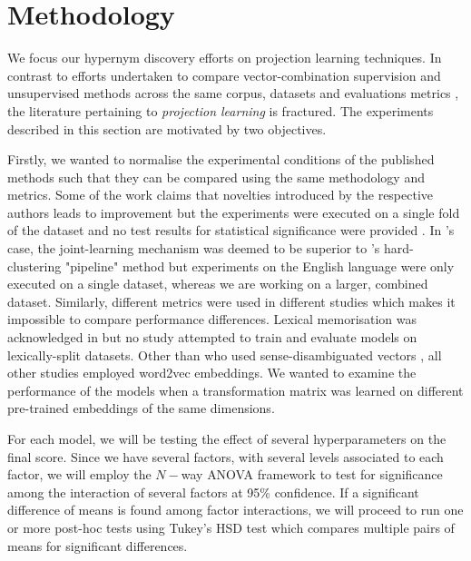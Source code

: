 \chapter{Methodology}

We focus our hypernym discovery efforts on projection learning techniques.  In contrast to efforts undertaken to compare vector-combination supervision and unsupervised methods across the same corpus, datasets and evaluations metrics \citep{shwartz2017siege, roller2014inclusive, levy2015supervised}, the literature pertaining to \textit{projection learning} is fractured.  The experiments described in this section are motivated by two objectives.  

Firstly, we wanted to normalise the experimental conditions of the published methods such that they can be compared using the same methodology and metrics.  Some of the work claims that novelties introduced by the respective authors leads to improvement but the experiments were executed on a single fold of the dataset and no test results for statistical significance were provided \citep{Fu2014, ustalov2017negative, yamane2016distributional}.  In \citeauthor{yamane2016distributional}'s case, the joint-learning mechanism was deemed to be superior to \citeauthor{Fu2014}'s hard-clustering "pipeline" method but experiments on the English language were only executed on a single dataset, whereas we are working on a larger, combined dataset.  Similarly, different metrics were used in different studies which makes it impossible to compare performance differences.  Lexical memorisation was acknowledged in \cite{espinosa2016supervised} but no study attempted to train and evaluate models on lexically-split datasets.  Other than \cite{espinosa2016supervised} who used sense-disambiguated vectors \citep{iacobacci2015sensembed}, all other studies employed word2vec embeddings.  We wanted to examine the performance of the models when a transformation matrix was learned on different pre-trained embeddings of the same dimensions.  

For each model, we will be testing the effect of several hyperparameters on the final score.  Since we have several factors, with several levels associated to each factor, we will employ the $N-$way \ac{ANOVA} framework to test for significance among the interaction of several factors at 95\% confidence.  If a significant difference of means is found among factor interactions, we will proceed to run one or more post-hoc tests using Tukey's \ac{HSD} test which compares multiple pairs of means for significant differences.

